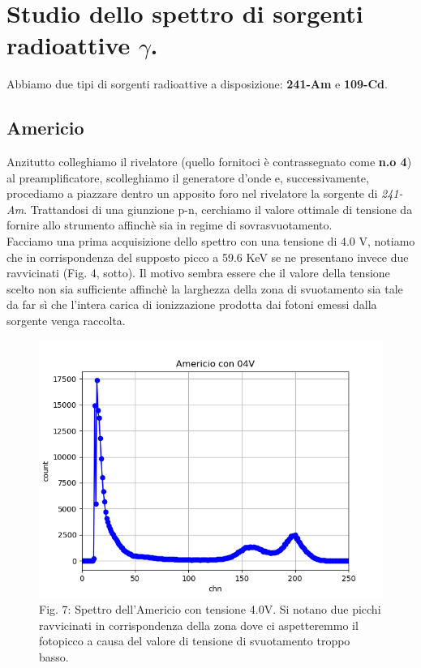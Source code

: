 \documentclass[a4paper]{article}
\begin{document}
\section{Studio dello spettro di sorgenti radioattive $\gamma$.}
Abbiamo due tipi di sorgenti radioattive a disposizione: \textbf{241-Am} e \textbf{109-Cd}. 

\subsection{Americio}
Anzitutto colleghiamo il rivelatore (quello fornitoci è contrassegnato come \textbf{n.o 4}) al preamplificatore, scolleghiamo il generatore d'onde e, successivamente, procediamo a piazzare dentro un apposito foro nel rivelatore la sorgente di \textit{241-Am}.  Trattandosi di una giunzione p-n, cerchiamo il valore ottimale di tensione da fornire allo strumento affinchè sia in regime di sovrasvuotamento. 
\\

Facciamo una prima acquisizione dello spettro con una tensione di 4.0 V, notiamo che in corrispondenza del supposto picco a 59.6 KeV se ne presentano invece due ravvicinati (Fig. 4, sotto). Il motivo sembra essere che il valore della tensione scelto non sia sufficiente affinchè la larghezza della zona di svuotamento sia tale da far sì che l'intera carica di ionizzazione prodotta dai fotoni emessi dalla sorgente venga raccolta.

\begin{figure}[H]
\includegraphics[width=1\textwidth]{Americio_con_04V}
        \caption{Fig. 7: Spettro dell'Americio con tensione 4.0V. Si notano due picchi ravvicinati in corrispondenza della zona dove ci                                     						 aspetteremmo il fotopicco a causa del valore di tensione di svuotamento troppo basso.}
        \label{fig:7}
\end{figure}
\end{document}
